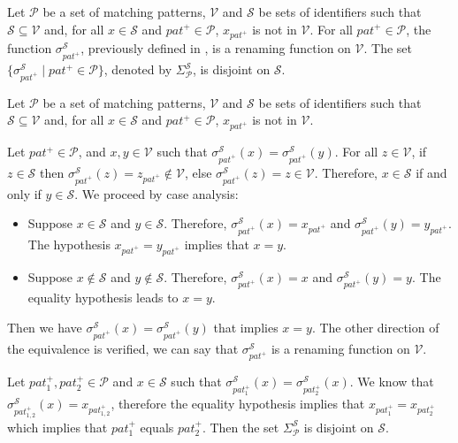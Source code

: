 \begin{lemma}
    \label{lem:semantics:grsync:causality:dependencies:renaming}
    Let $\mathcal{P}$ be a set of matching patterns, $\mathcal{V}$ and $\mathcal{S}$ be sets of
    identifiers such that $\mathcal{S} \subseteq \mathcal{V}$ and, for all $x \in \mathcal{S}$ and
    $pat^+ \in \mathcal{P}$, $x_{pat^+}$ is not in $\mathcal{V}$.
    For all $pat^+ \in \mathcal{P}$, the function $\sigma^{\mathcal{S}}_{pat^+}$, previously defined
    in , is a renaming function on $\mathcal{V}$.
    The set $\{\sigma^{\mathcal{S}}_{pat^+} \mid pat^+ \in \mathcal{P}\}$, denoted by
    $\Sigma^{\mathcal{S}}_{\mathcal{P}}$, is disjoint on $\mathcal{S}$.
\end{lemma}
\begin{skippableproof}
    Let $\mathcal{P}$ be a set of matching patterns, $\mathcal{V}$ and $\mathcal{S}$ be sets of
    identifiers such that $\mathcal{S} \subseteq \mathcal{V}$ and, for all $x \in \mathcal{S}$ and
    $pat^+ \in \mathcal{P}$, $x_{pat^+}$ is not in $\mathcal{V}$.

    Let $pat^+ \in \mathcal{P}$, and $x, y \in \mathcal{V}$ such that
    $\sigma^{\mathcal{S}}_{pat^+}(x) = \sigma^{\mathcal{S}}_{pat^+}(y)$.
    For all $z \in \mathcal{V}$, if $z \in \mathcal{S}$ then
    $\sigma^{\mathcal{S}}_{pat^+}(z) = z_{pat^+} \notin \mathcal{V}$, else
    $\sigma^{\mathcal{S}}_{pat^+}(z) = z \in \mathcal{V}$.
    Therefore, $x \in \mathcal{S}$ if and only if $y \in \mathcal{S}$.
    We proceed by case analysis:
    \begin{itemize}
        \item Suppose $x \in \mathcal{S}$ and $y \in \mathcal{S}$.
              Therefore, $\sigma^{\mathcal{S}}_{pat^+}(x) = x_{pat^+}$ and
              $\sigma^{\mathcal{S}}_{pat^+}(y) = y_{pat^+}$. The hypothesis $x_{pat^+} = y_{pat^+}$
              implies that $x = y$.

        \item Suppose $x \notin \mathcal{S}$ and $y \notin \mathcal{S}$.
              Therefore, $\sigma^{\mathcal{S}}_{pat^+}(x) = x$ and
              $\sigma^{\mathcal{S}}_{pat^+}(y) = y$. The equality hypothesis leads to $x = y$.
    \end{itemize}
    Then we have $\sigma^{\mathcal{S}}_{pat^+}(x) = \sigma^{\mathcal{S}}_{pat^+}(y)$ that implies
    $x = y$. The other direction of the equivalence is verified, we can say that
    $\sigma^{\mathcal{S}}_{pat^+}$ is a renaming function on $\mathcal{V}$.

    Let $pat^+_1, pat^+_2 \in \mathcal{P}$ and $x \in \mathcal{S}$ such that
    $\sigma^{\mathcal{S}}_{pat_1^+}(x) = \sigma^{\mathcal{S}}_{pat_2^+}(x)$.
    We know that $\sigma^{\mathcal{S}}_{pat_{1,2}^+}(x) = x_{pat_{1,2}^+}$, therefore the equality
    hypothesis implies that $x_{pat_{1}^+} = x_{pat_{2}^+}$ which implies that $pat_1^+$ equals
    $pat_2^+$.
    Then the set $\Sigma^{\mathcal{S}}_{\mathcal{P}}$ is disjoint on $\mathcal{S}$.
\end{skippableproof}

